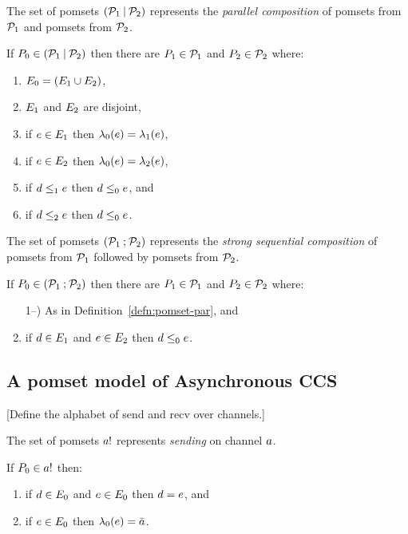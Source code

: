 The set of pomsets $(\mathcal{P}_1\mathbin{\mid}\mathcal{P}_2)$ represents the \emph{parallel composition} of pomsets from
$\mathcal{P}_1$ and pomsets from $\mathcal{P}_2$.
\begin{definition}
  \label{defn:pomset-par}
  If $P_0 \in (\mathcal{P}_1\mathbin{\mid}\mathcal{P}_2)$ then
  there are $P_1\in\mathcal{P}_1$ and $P_2\in\mathcal{P}_2$ where:
  \begin{enumerate}
  \item $E_0 = (E_1\cup E_2)$,
  \item $E_1$ and  $E_2$ are disjoint,
  \item if $e\in E_1$ then $\lambda_0(e) = \lambda_1(e)$, 
  \item if $e\in E_2$ then $\lambda_0(e) = \lambda_2(e)$,
  \item if $d\le_1e$ then $d\le_0e$, and
  \item if $d\le_2e$ then $d\le_0e$.
    \setcounter{pomsetParCount}{\value{enumi}}
  \end{enumerate}
\end{definition}
 
The set of pomsets $(\mathcal{P}_1\mathbin{;}\mathcal{P}_2)$ represents the \emph{strong sequential composition} of pomsets from
$\mathcal{P}_1$ followed by pomsets from $\mathcal{P}_2$.
\begin{definition}
  If $P_0 \in (\mathcal{P}_1\mathbin{;}\mathcal{P}_2)$ then
  there are $P_1\in\mathcal{P}_1$ and $P_2\in\mathcal{P}_2$ where:
  \begin{enumerate}
    \setcounter{enumi}{\value{pomsetParCount}}
  \item[1--\thepomsetParCount)] As in Definition~\ref{defn:pomset-par}, and
  \item if $d\in E_1$ and $e\in E_2$ then $d\le_0e$.
  \end{enumerate}
\end{definition}

\subsection{A pomset model of Asynchronous CCS}

[Define the alphabet of send and recv over channels.]

The set of pomsets $\sSEND\aChan{}$ represents \emph{sending} on channel $a$.
\begin{definition}
  If $\aPS_0 \in \sSEND\aChan{}$ then:
  \begin{enumerate}
  \item if $d\in E_0$ and $e\in E_0$ then $d=e$, and
  \item if $e\in E_0$ then $\lambda_0(e) = \bar{a}_{}$.
  \end{enumerate}
\end{definition}

